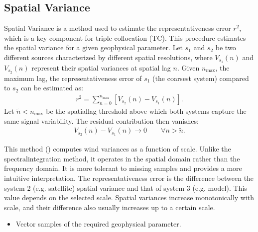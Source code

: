 \documentclass[a4paper,10pt,english]{sphinxmanual}
\begin{document}
\subsection{Spatial Variance}
\label{\detokenize{alg-02-validation:spatial-variance}}
\sphinxAtStartPar
Spatial Variance is a method used to estimate the representativeness error
\(r^2\), which is a key component for triple collocation (TC). This
procedure estimates the spatial variance for a given geophysical parameter.
Let \(s_1\) and \(s_2\) be two different sources characterized by
different spatial resolutions, where \(V_{s_1}(n)\) and
\(V_{s_2}(n)\) represent their spatial variances at spatial lag \(n\).
Given \(n_{\max}\), the maximum lag, the representativeness error of
\(s_1\) (the coarsest system) compared to \(s_2\) can be estimated as:
\begin{equation}\label{equation:alg-02-validation:eq-cvtdd-r2-spatial-variance}
\begin{split}r^2 = \sum_{n=0}^{n_{\max}}
\left[V_{s_2}(n)-V_{s_1}(n)\right] .\end{split}
\end{equation}
\sphinxAtStartPar
Let \(\tilde{n}<n_{\max}\) be the spatial\sphinxhyphen{}lag threshold above which both
systems capture the same signal variability. The residual contribution then
vanishes:
\begin{equation*}
\begin{split}V_{s_2}(n)-V_{s_1}(n) \to 0
\qquad \forall n>\tilde{n} .\end{split}
\end{equation*}
\sphinxAtStartPar
{}

\sphinxAtStartPar
This method ({\hyperref[\detokenize{alg-02-validation:ref-vogelzang-spatial-variance}]{}})
computes wind variances as a function of scale. Unlike the spectral\sphinxhyphen{}integration
method, it operates in the spatial domain rather than the frequency domain. It
is more tolerant to missing samples and provides a more intuitive
interpretation. The representativeness error is the difference between the
system 2 (e.g. satellite) spatial variance and that of system 3 (e.g. model).
This value depends on the selected scale. Spatial variances increase
monotonically with scale, and their difference also usually increases up to a
certain scale.

\sphinxAtStartPar
{}
\begin{itemize}
\item {} 
\sphinxAtStartPar
Vector samples of the required geophysical parameter.

\end{itemize}
\end{document}
